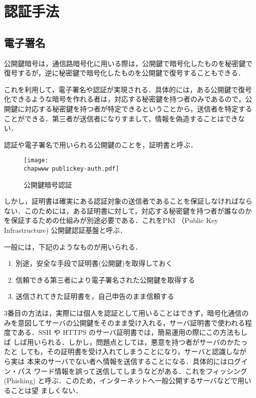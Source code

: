 \section{認証手法}

\subsection{電子署名}

公開鍵暗号は，通信路暗号化に用いる際は，公開鍵で暗号化したものを秘密鍵で
復号するが，逆に秘密鍵で暗号化したものを公開鍵で復号することもできる．

これを利用して，電子署名や認証が実現される．具体的には，ある公開鍵で復号
化できるような暗号を作れる者は，対応する秘密鍵を持つ者のみであるので，公
開鍵に対応する秘密鍵を持つ者が特定できるということから，送信者を特定する
ことができる．第三者が送信者になりすまして，情報を偽造することはできない．

認証や電子署名で用いられる公開鍵のことを，証明書と呼ぶ．

\begin{figure}[ht]
 \begin{center}
  \texttt{[image: \\chapwww publickey-auth.pdf]}
  \label{fig:04:publickey-auth}
  \caption{公開鍵暗号認証}
 \end{center}
\end{figure}

しかし，証明書は確実にある認証対象の送信者であることを保証しなければなら
ない．このためには，ある証明書に対して，対応する秘密鍵を持つ者が誰なのか
を保証するための仕組みが別途必要である．これをPKI （Public Key
Infrastructure) 公開鍵認証基盤と呼ぶ．

一般には，下記のようなものが用いられる．

\begin{enumerate}
 \item 別途，安全な手段で証明書(公開鍵)を取得しておく
 \item 信頼できる第三者により電子署名された公開鍵を取得する
 \item 送信されてきた証明書を，自己申告のまま信頼する
\end{enumerate}

3番目の方法は，実際には個人を認証として用いることはできず，暗号化通信の
みを意図してサーバの公開鍵をそのまま受け入れる，サーバ証明書で使われる程
度である．SSH や HTTPS のサーバ証明書では，簡易運用の際にこの方法もしば
しば用いられる．しかし，問題点としては，悪意を持つ者がサーバのかたったと
しても，その証明書を受け入れてしまうことになり，サーバと認識しながら実は
本来のサーバでない者へ情報を送信することになる．具体的にはログイン・パス
ワード情報を誤って送信してしまうなどがある．これをフィッシング(Phishing)
と呼ぶ．このため，インターネットへ一般公開するサーバなどで用いることは望
ましくない．

